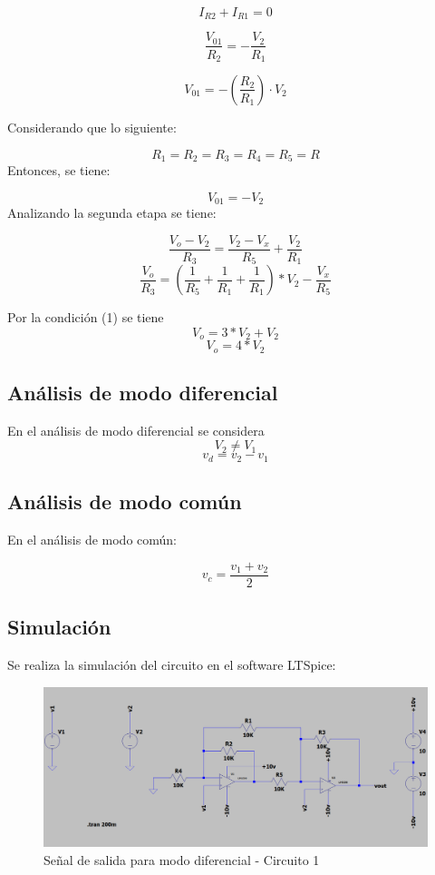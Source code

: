 \[I_{R2} + I_{R1} = 0 \]


\[\frac{V_{01}}{R_2} = -\frac{V_2}{R_1}\]


\[{V_{01}} = -(\frac{R_2}{R_1}) \cdot {V_2}\]

Considerando que lo siguiente:

\[{R_1}={R_2}={R_3}={R_4}={R_5}
      = {R}\]
Entonces, se tiene:
 
 
 \[{V_{01}} = -{V_2}\]
Analizando la segunda etapa se tiene:

\[\frac{V_o-V_2}{R_3}
      = \frac{V_2-V_x}{R_5}+\frac{V_2}{R_1}\]
\[\frac{V_o}{R_3}
      = (\frac{1}{R_5}+\frac{1}{R_1}+\frac{1}{R_1})*{V_2}-\frac{V_x}{R_5}\]

Por la condición (1) se tiene
      \[{V_o}=3*{V_2}+{V_2}\]
      \[{V_o}=4*{V_2}\]
      
\subsection{Análisis de modo diferencial }

En el análisis de modo diferencial se considera
 \[V_2 \neq V_1\]
\[{v_d}
      = {v_2-v_1}\]
      
\subsection{Análisis de modo común}

En el análisis de modo común:

\[{v_c}
      = \frac{v_1+v_2}{2}\]

\subsection{Simulación}

Se realiza la simulación del circuito en el software LTSpice:

\begin{figure}[h!]
    \centering
    \includegraphics[width=1\linewidth]{Secciones/Circuito1/circuito1_simulacion.png}
    \caption{Señal de salida para modo diferencial - Circuito 1}
    \label{fig:enter-label}
\end{figure}

